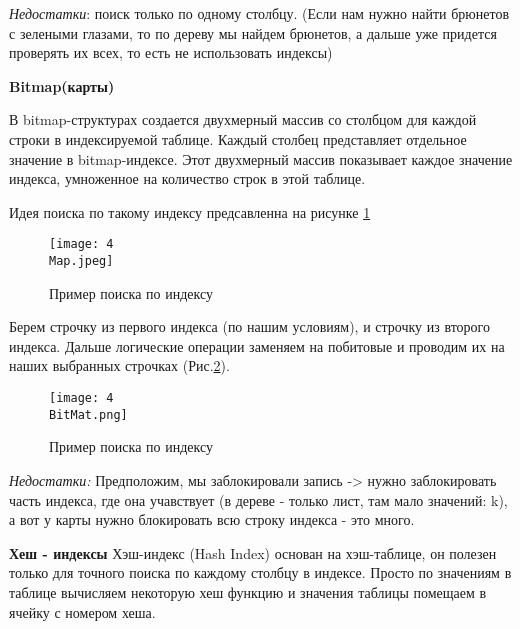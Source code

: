 \textit{Недостатки}: поиск только по одному столбцу. (Если нам нужно найти брюнетов с зелеными глазами, то по дереву мы найдем брюнетов, а дальше уже придется проверять их всех, то есть не использовать индексы)

\textbf{Bitmap(карты)} 

В bitmap-структурах создается двухмерный массив со столбцом для каждой строки в индексируемой таблице. Каждый столбец представляет отдельное значение в bitmap-индексе. Этот двухмерный массив показывает каждое значение индекса, умноженное на количество строк в этой таблице.

Идея поиска по такому индексу предсавленна на рисунке \ref{fig:Map}  

\begin{figure}[!h]
    \centering
    \texttt{[image: 4\\Map.jpeg]}
     \label{fig:Map}
    \caption{Пример поиска по индексу}
\end{figure}


Берем строчку из первого индекса (по нашим условиям), и строчку из второго индекса. Дальше логические операции заменяем на побитовые и проводим их на наших выбранных строчках (Рис.\ref{fig:BMap}).

\begin{figure}[!h]
    \centering
    \texttt{[image: 4\\BitMat.png]}
    \label{fig:BMap}
    \caption{Пример поиска по индексу}
\end{figure}

\textit{Недостатки:} Предположим, мы заблокировали запись -> нужно заблокировать часть индекса, где она учавствует (в дереве - только лист, там мало значений: k), а вот у карты нужно блокировать всю строку индекса - это много.


\textbf{Хеш - индексы} 
Хэш-индекс (Hash Index) основан на хэш-таблице, он полезен только для точного поиска по каждому столбцу в индексе. Просто по значениям в таблице вычисляем некоторую хеш функцию и значения таблицы помещаем в ячейку с номером хеша. 


